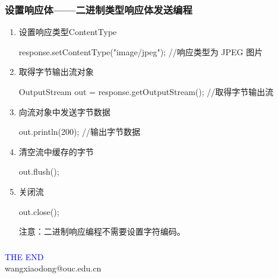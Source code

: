 \begin{frame}[fragile] %
\frametitle{设置响应体——二进制类型响应体发送编程}
\begin{enumerate}
\item 设置响应类型ContentType
\begin{javaCode}
response.setContentType("image/jpeg"); //响应类型为 JPEG 图片
\end{javaCode}

\item 取得字节输出流对象
\begin{javaCode}
OutputStream out = response.getOutputStream(); //取得字节输出流
\end{javaCode}

\item 向流对象中发送字节数据
\begin{javaCode}
out.println(200); //输出字节数据
\end{javaCode}

\item 清空流中缓存的字节
\begin{javaCode}
out.flush();
\end{javaCode}

\item 关闭流
\begin{javaCode}
out.close();
\end{javaCode}

{\Red\kai 注意：二进制响应编程不需要设置字符编码。}
\end{enumerate}
\end{frame}
\begin{frame}[fragile] %
\frametitle{} 

\end{frame}
\begin{frame}
\centering
{\Huge \textcolor{blue}{THE END}} \\
\vspace{5mm}
{\Large wangxiaodong@ouc.edu.cn} \\
\end{frame}

